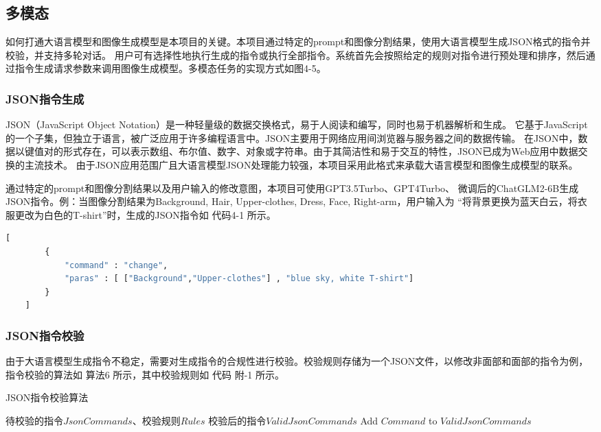 \documentclass[a4paper,AutoFakeBold,oneside,12pt]{book}
\begin{document}
\subsection{多模态}
如何打通大语言模型和图像生成模型是本项目的关键。本项目通过特定的prompt和图像分割结果，使用大语言模型生成JSON格式的指令并校验，并支持多轮对话。
用户可有选择性地执行生成的指令或执行全部指令。系统首先会按照给定的规则对指令进行预处理和排序，然后通过指令生成请求参数来调用图像生成模型。多模态任务的实现方式如图4-5。

\subsubsection{JSON指令生成}
JSON（JavaScript Object Notation）是一种轻量级的数据交换格式，易于人阅读和编写，同时也易于机器解析和生成。
它基于JavaScript的一个子集，但独立于语言，被广泛应用于许多编程语言中。JSON主要用于网络应用间浏览器与服务器之间的数据传输。
在JSON中，数据以键值对的形式存在，可以表示数组、布尔值、数字、对象或字符串。由于其简洁性和易于交互的特性，JSON已成为Web应用中数据交换的主流技术。
由于JSON应用范围广且大语言模型JSON处理能力较强，本项目采用此格式来承载大语言模型和图像生成模型的联系。

通过特定的prompt和图像分割结果以及用户输入的修改意图，本项目可使用GPT3.5Turbo、GPT4Turbo、
微调后的ChatGLM2-6B生成JSON指令。例：当图像分割结果为Background, Hair, Upper-clothes, Dress, Face, Right-arm，用户输入为
“将背景更换为蓝天白云，将衣服更改为白色的T-shirt”时，生成的JSON指令如 代码4-1 所示。

\begin{lstlisting}[language=Python, caption=生成的指令, label=plus, tabsize=2]  
    [
        {
            "command" : "change",
            "paras" : [ ["Background","Upper-clothes"] , "blue sky, white T-shirt"]
        }
    ]
\end{lstlisting} 

\subsubsection{JSON指令校验}
由于大语言模型生成指令不稳定，需要对生成指令的合规性进行校验。校验规则存储为一个JSON文件，以修改非面部和面部的指令为例，指令校验的算法如 算法6 所示，其中校验规则如 代码 附-1 所示。
\begin{algorithm} 
	\begin{spacing}{1.3}
		\caption{JSON指令校验算法} 
		\label{JsonCommandCheckAlgorithm}
		\renewcommand{\algorithmicrequire}{\textbf{输入：}}
		\renewcommand{\algorithmicensure}{\textbf{输出：}} 
			\begin{algorithmic}[1] 
				\Require 待校验的指令$JsonCommands$、校验规则$Rules$
				\Ensure 校验后的指令$ValidJsonCommands$
                        \State Add $Command$ to $ValidJsonCommands$
                    \EndIf
                \EndFor
			\end{algorithmic}
	\end{spacing}
\end{algorithm}
\end{document}
